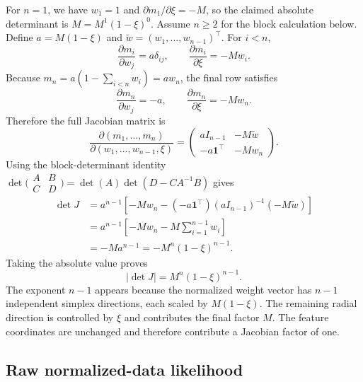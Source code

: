 \documentclass[10pt]{article}
\theoremstyle{definition}
\theoremstyle{remark}
\begin{document}
For $n=1$, we have $w_1=1$ and
$\partial m_1/\partial\xi=-M$, so the claimed absolute determinant is
$M=M^1(1-\xi)^0$.  Assume $n\geq2$ for the block calculation below.
Define $a=M(1-\xi)$ and
$\widetilde w=(w_1,\ldots,w_{n-1})^\top$.  For $i<n$,
\begin{equation}
  \frac{\partial m_i}{\partial w_j}=a\delta_{ij},
  \qquad
  \frac{\partial m_i}{\partial\xi}=-Mw_i.
  \label{eq:appendix-jacobian-first-rows}
\end{equation}
Because $m_n=a(1-\sum_{i<n}w_i)=aw_n$, the final row satisfies
\begin{equation}
  \frac{\partial m_n}{\partial w_j}=-a,
  \qquad
  \frac{\partial m_n}{\partial\xi}=-Mw_n.
  \label{eq:appendix-jacobian-last-row}
\end{equation}
Therefore the full Jacobian matrix is
\begin{equation}
  \frac{\partial(m_1,\ldots,m_n)}
       {\partial(w_1,\ldots,w_{n-1},\xi)}
  =
  \begin{pmatrix}
    aI_{n-1} & -M\widetilde w\\
    -a\mathbf 1^\top & -Mw_n
  \end{pmatrix}.
  \label{eq:appendix-dequantization-jacobian-matrix}
\end{equation}
Using the block-determinant identity
$\det\bigl(\begin{smallmatrix}A&B\\C&D\end{smallmatrix}\bigr)
=\det(A)\det(D-CA^{-1}B)$ gives
\begin{align}
  \det J
  &=a^{n-1}
    \left[-Mw_n
    -(-a\mathbf 1^\top)(aI_{n-1})^{-1}(-M\widetilde w)
    \right]
    \nonumber\\
  &=a^{n-1}
    \left[-Mw_n-M\sum_{i=1}^{n-1}w_i\right]
    \nonumber\\
  &=-Ma^{n-1}
   =-M^n(1-\xi)^{n-1}.
  \label{eq:appendix-dequantization-signed-determinant}
\end{align}
Taking the absolute value proves
\begin{equation}
  |\det J|=M^n(1-\xi)^{n-1}.
\end{equation}
The exponent $n-1$ appears because the normalized weight vector has
$n-1$ independent simplex directions, each scaled by $M(1-\xi)$.  The
remaining radial direction is controlled by $\xi$ and contributes the final
factor $M$.  The feature coordinates are unchanged and therefore contribute
a Jacobian factor of one.

\subsection{Raw normalized-data likelihood}
\end{document}
